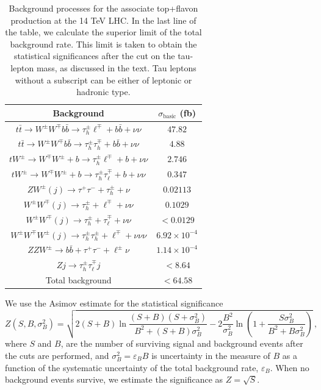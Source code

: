 \documentclass[prd,amsfonts,onecolumn,superscriptaddress,aps,nofootinbib,11pt]{revtex4-1}
\begin{document}
%
\begin{table}[h!]
\begin{tabular}{c c}
\hline
 Background & $\sigma_{\text{basic}}$ (fb) \\ \hline\hline 
 $t\bar{t}\to W^\pm W^\mp b\bar{b}\to \tau_{h}^\pm \ell^\mp + b\bar{b}+\nu\nu$ & $47.82$\\ 
 
 $t\bar{t}\to W^\pm W^\mp b\bar{b}\to \tau_{h}^\pm \tau_{h}^\mp + b\bar{b}+\nu\nu$ & $4.88$ \\ 
 \hline

 $tW^\pm \to W^\mp W^\pm+b\to \tau_{h}^\pm \ell^\mp + b+ \nu\nu$ & $2.746$       \\ 
 $tW^\pm \to W^\mp W^\pm+b\to \tau_h^\pm \tau_{\ell}^\mp + b+ \nu\nu$ & $0.347$ \\ \hline
 
 $ZW^\pm(j)  \to \tau^+\tau^- + \tau_{h}^\pm + \nu$ & $0.02113$ \\ 

 $W^\pm W^\mp(j) \to \tau_h^\pm + \ell^\mp + \nu\nu$ & $0.1029$ \\ 
 
 $W^\pm W^\mp(j) \to \tau_h^\pm + \tau_{\ell}^\mp + \nu\nu$ & $<0.0129$ \\ 
 \hline

 $W^\pm W^\mp W^\pm(j)  \to \tau_h^\pm\tau_h^\pm + \ell^\mp + \nu\nu\nu$ & $6.92\times 10^{-4}$  \\ 
 
 $Z Z W^\pm \to b \bar{b} + \tau^+ \tau^- + \ell^{\pm} \nu$ & $1.14 \times 10^{-4}$ \\ 
 \hline

 $Z j \to \tau_h^{\pm}\tau_{\ell}^{\mp}j$ & $<8.64$ \\ 
 \hline
 Total background & $<64.58$ \\
 \hline
\end{tabular}
\caption{Background processes for the associate top+flavon production at the 14 TeV LHC. In the last line of the table, we calculate the superior limit of the total background rate. This limit is taken to obtain the statistical significances after the cut on the tau-lepton mass, as discussed in the text. Tau leptons without a subscript can be either of leptonic or hadronic type.}
\label{tab:simple}
\end{table}
%
We use the Asimov estimate for the statistical significance~\cite{Cowan_2011}
\begin{equation}\label{eq:asimov}
    Z(S, B, \sigma_B^2) = \sqrt{2 (S+B)\ln \frac{(S+B)(S+\sigma_B^2)}{B^2 + (S+B)\sigma_B^2} - 2 \frac{B^2}{\sigma_B^2} \ln \left(1 +\frac{S \sigma_B^2}{B^2 + B \sigma_B^2}\right)} \,,
\end{equation}
where $S$ and $B$, are the number of surviving signal and background events after the cuts are performed, and $\sigma_B^2 = \varepsilon_B B$ is uncertainty in the measure of $B$ as a function of the systematic uncertainty of the total background rate, $\varepsilon_B$. When no background events survive, we estimate the significance as $Z=\sqrt{S}$.
\end{document}
